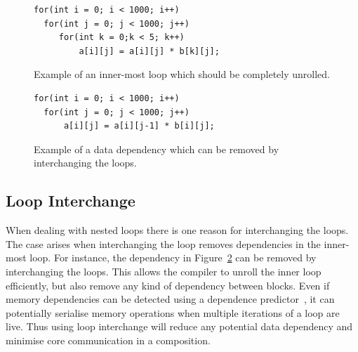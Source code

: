 \begin{figure}[t]
\lstset{language=C,numbersep=4pt}
\begin{center}
\begin{lstlisting}
for(int i = 0; i < 1000; i++)
  for(int j = 0; j < 1000; j++)
     for(int k = 0;k < 5; k++)
         a[i][j] = a[i][j] * b[k][j];
\end{lstlisting}
\end{center}
\vspace{-1em}
\caption{Example of an inner-most loop which should be completely unrolled.}
\label{lst:small}
\vspace{1em}
\end{figure}

\begin{figure}[t]
\lstset{language=C,numbersep=4pt}
\begin{center}
\begin{lstlisting}
for(int i = 0; i < 1000; i++)
  for(int j = 0; j < 1000; j++)
      a[i][j] = a[i][j-1] * b[i][j];
\end{lstlisting}
\end{center}
\vspace{-1em}
\caption{Example of a data dependency which can be removed by interchanging the loops.}
\label{lst:dep}
\vspace{1em}
\end{figure}


\subsection{Loop Interchange}
When dealing with nested loops there is one reason for interchanging the loops.
The case arises when interchanging the loop removes dependencies in the inner-most loop.
For instance, the dependency in Figure~\ref{lst:dep} can be removed by interchanging the loops. 
This allows the compiler to unroll the inner loop efficiently, but also remove any kind of dependency between blocks.
Even if memory dependencies can be detected using a dependence predictor~\cite{chrysos1998storesets}, it can potentially serialise memory operations when multiple iterations of a loop are live.
Thus using loop interchange will reduce any potential data dependency and minimise core communication in a composition.

